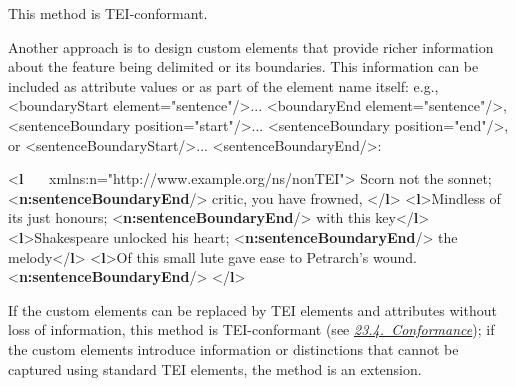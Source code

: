 This method is TEI-conformant.\par
Another approach is to design custom elements that provide richer information about the feature being delimited or its boundaries. This information can be included as attribute values or as part of the element name itself: e.g., <boundaryStart element="sentence"/>... <boundaryEnd element="sentence"/>, <sentenceBoundary position="start"/>... <sentenceBoundary position="end"/>, or <sentenceBoundaryStart/>... <sentenceBoundaryEnd/>: \par\bgroup{}\exampleFont \begin{shaded}\noindent\mbox{}{<\textbf{l}\mbox{}\newline 
   xmlns:n="http://www.example.org/ns/nonTEI">}\mbox{}\newline 
{}Scorn not the sonnet;\mbox{}\newline 
{<\textbf{n:sentenceBoundaryEnd}/>}\mbox{}\newline 
{}critic, you have frowned,\mbox{}\newline 
{</\textbf{l}>}\mbox{}\newline 
{<\textbf{l}>}Mindless of its just honours; {<\textbf{n:sentenceBoundaryEnd}/>}\mbox{}\newline 
{}with this key{</\textbf{l}>}\mbox{}\newline 
{<\textbf{l}>}Shakespeare unlocked his heart; {<\textbf{n:sentenceBoundaryEnd}/>}\mbox{}\newline 
{}the melody{</\textbf{l}>}\mbox{}\newline 
{<\textbf{l}>}Of this small lute gave ease to Petrarch's wound. {<\textbf{n:sentenceBoundaryEnd}/>}\mbox{}\newline 
{</\textbf{l}>}\end{shaded}\egroup\par \par
If the custom elements can be replaced by TEI elements and attributes without loss of information, this method is TEI-conformant (see \textit{\hyperref[CF]{23.4.\ Conformance}}); if the custom elements introduce information or distinctions that cannot be captured using standard TEI elements, the method is an extension.\par
